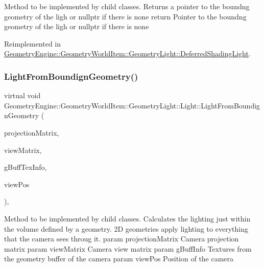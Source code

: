 Method to be implemented by child classes. Returns a pointer to the boundng geometry of the ligh or nullptr if there is none return Pointer to the boundng geometry of the ligh or nullptr if there is none 

Reimplemented in \mbox{\hyperlink{class_geometry_engine_1_1_geometry_world_item_1_1_geometry_light_1_1_deferred_shading_light_a742416954d3b05484799e4c1235567b1}{Geometry\+Engine\+::\+Geometry\+World\+Item\+::\+Geometry\+Light\+::\+Deferred\+Shading\+Light}}.

\mbox{\label{class_geometry_engine_1_1_geometry_world_item_1_1_geometry_light_1_1_light_a4dfee4fc27c75493f992a84c2ea3ff95}} 
\subsubsection{\texorpdfstring{LightFromBoundignGeometry()}{LightFromBoundignGeometry()}}
{\footnotesize\ttfamily virtual void Geometry\+Engine\+::\+Geometry\+World\+Item\+::\+Geometry\+Light\+::\+Light\+::\+Light\+From\+Boundign\+Geometry (\begin{DoxyParamCaption}\item[{const Q\+Matrix4x4 \&}]{projection\+Matrix,  }\item[{const Q\+Matrix4x4 \&}]{view\+Matrix,  }\item[{const \mbox{\hyperlink{struct_geometry_engine_1_1_g_buffer_texture_info}{G\+Buffer\+Texture\+Info}} \&}]{g\+Buff\+Tex\+Info,  }\item[{const Q\+Vector3D \&}]{view\+Pos }\end{DoxyParamCaption})\hspace{0.3cm}{\ttfamily [inline]}, {\ttfamily [virtual]}}

Method to be implemented by child classes. Calculates the lighting just within the volume defined by a geometry. 2D geometries apply lighting to everything that the camera sees throug it. param projection\+Matrix Camera projection matrix param view\+Matrix Camera view matrix param g\+Buff\+Info Textures from the geometry buffer of the camera param view\+Pos Position of the camera 

